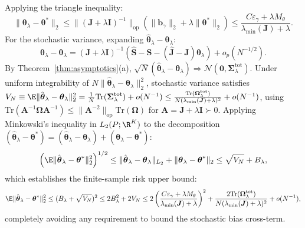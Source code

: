 Applying the triangle inequality:
\begin{equation}
    \|\boldsymbol{\theta}_\lambda - \boldsymbol{\theta}^*\|_2 \le \|(\boldsymbol{J} + \lambda \boldsymbol{I})^{-1}\|_{\mathrm{op}} \left( \|\boldsymbol{b}_\gamma\|_2 + \lambda \|\boldsymbol{\theta}^*\|_2 \right) \le \frac{C \varepsilon_\gamma + \lambda M_\theta}{\lambda_{\min}(\boldsymbol{J}) + \lambda}.
\end{equation}
For the stochastic variance, expanding $\hat{\boldsymbol{\theta}}_\lambda - \boldsymbol{\theta}_\lambda$:
\begin{equation}
    \hat{\boldsymbol{\theta}}_\lambda - \boldsymbol{\theta}_\lambda = (\boldsymbol{J} + \lambda \boldsymbol{I})^{-1} \left( \hat{\boldsymbol{S}} - \boldsymbol{S} - (\hat{\boldsymbol{J}} - \boldsymbol{J})\boldsymbol{\theta}_\lambda \right) + o_p(N^{-1/2}).
\end{equation}
By Theorem~\ref{thm:asymptotics}(a), $\sqrt{N}(\hat{\boldsymbol{\theta}}_\lambda - \boldsymbol{\theta}_\lambda) \Rightarrow \mathcal{N}(\mathbf{0}, \boldsymbol{\Sigma}_\lambda^{\mathrm{tot}})$. Under uniform integrability of $N\|\hat{\boldsymbol{\theta}}_\lambda - \boldsymbol{\theta}_\lambda\|_2^2$, stochastic variance satisfies $V_N \equiv \E\|\hat{\boldsymbol{\theta}}_\lambda - \boldsymbol{\theta}_\lambda\|_2^2 = \frac{1}{N}\mathrm{Tr}(\boldsymbol{\Sigma}_\lambda^{\mathrm{tot}}) + o(N^{-1}) \le \frac{\mathrm{Tr}(\boldsymbol{\Omega}_\lambda^{\mathrm{tot}})}{N (\lambda_{\min}(\boldsymbol{J}) + \lambda)^2} + o(N^{-1})$, using $\mathrm{Tr}(\boldsymbol{A}^{-1}\boldsymbol{\Omega}\boldsymbol{A}^{-1}) \le \|\boldsymbol{A}^{-2}\|_{\mathrm{op}}\mathrm{Tr}(\boldsymbol{\Omega})$ for $\boldsymbol{A} = \boldsymbol{J}+\lambda\boldsymbol{I} \succ 0$.
Applying Minkowski's inequality in $L_2(P; \R^K)$ to the decomposition $(\hat{\boldsymbol{\theta}}_\lambda - \boldsymbol{\theta}^*) = (\hat{\boldsymbol{\theta}}_\lambda - \boldsymbol{\theta}_\lambda) + (\boldsymbol{\theta}_\lambda - \boldsymbol{\theta}^*)$:
\begin{equation}
\label{eq:minkowski_risk}
    \left(\E\|\hat{\boldsymbol{\theta}}_\lambda - \boldsymbol{\theta}^*\|_2^2\right)^{1/2} \le \|\hat{\boldsymbol{\theta}}_\lambda - \boldsymbol{\theta}_\lambda\|_{L_2} + \|\boldsymbol{\theta}_\lambda - \boldsymbol{\theta}^*\|_2 \le \sqrt{V_N} + B_\lambda,
\end{equation}
which establishes the finite-sample risk upper bound:
\begin{equation}
    \E\|\hat{\boldsymbol{\theta}}_\lambda - \boldsymbol{\theta}^*\|_2^2 \le (B_\lambda + \sqrt{V_N})^2 \le 2 B_\lambda^2 + 2 V_N \le 2\left(\frac{C \varepsilon_\gamma + \lambda M_\theta}{\lambda_{\min}(\boldsymbol{J}) + \lambda}\right)^2 + \frac{2\mathrm{Tr}(\boldsymbol{\Omega}_\lambda^{\mathrm{tot}})}{N (\lambda_{\min}(\boldsymbol{J}) + \lambda)^2} + o(N^{-1}),
\end{equation}
completely avoiding any requirement to bound the stochastic bias cross-term.

